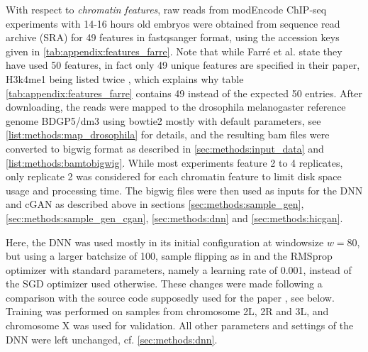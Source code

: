 With respect to \emph{chromatin features}, raw reads from modEncode ChIP-seq experiments with 14-16 hours old embryos \cite{Roy2010} 
were obtained from sequence read archive (SRA) for 49 features in fastqsanger format, using the accession keys given in \cref{tab:appendix:features_farre}.
Note that while Farr\'e et al. state they have used 50 features, in fact only 49 unique features are specified in their paper, H3k4me1 being listed twice \cite[p.~9]{Farre2018a},
which explains why table \ref{tab:appendix:features_farre} contains 49 instead of the expected 50 entries.
After downloading, the reads were mapped to the drosophila melanogaster reference genome BDGP5/dm3 using bowtie2 mostly with default parameters, 
see \cref{list:methods:map_drosophila} for details,
and the resulting bam files were converted to bigwig format as described in \cref{sec:methods:input_data} and \cref{list:methods:bamtobigwig}.
While most experiments feature 2 to 4 replicates, only replicate 2 was considered for each chromatin feature to limit disk space usage and processing time.
The bigwig files were then used as inputs for the DNN and cGAN as described above in sections \ref{sec:methods:sample_gen}, \ref{sec:methods:sample_gen_cgan}, \ref{sec:methods:dnn}
and \ref{sec:methods:hicgan}. 

Here, the DNN was used mostly in its initial configuration at windowsize $w=80$,
but using a larger batchsize of 100, sample flipping as in \cite{Farre2018a} and the RMSprop optimizer with standard parameters, namely a learning rate of 0.001,
instead of the SGD optimizer used otherwise.
These changes were made following a comparison with the source code supposedly used for the paper \cite{Farre2018a}, see below.
Training was performed on samples from chromosome 2L, 2R and 3L, and chromosome X was used for validation.
All other parameters and settings of the DNN were left unchanged, cf. \cref{sec:methods:dnn}.

